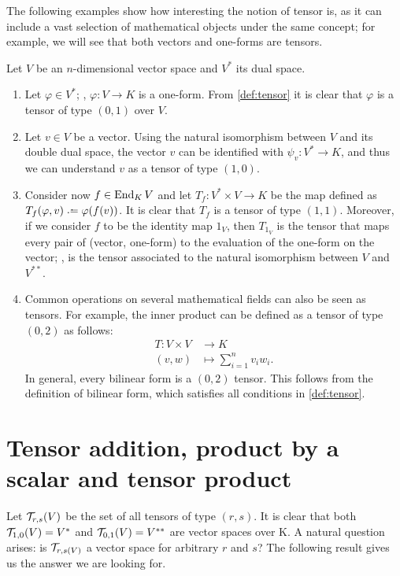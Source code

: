 \begin{example}
	\label{ex:tensors}
	The following examples show how interesting the notion of tensor is, as it can include a vast selection of mathematical objects under the same concept; for example, we will see that both vectors and one-forms are tensors.

	Let $V$ be an $n$-dimensional vector space and $V^*$ its dual space.
	\begin{enumerate}
		\item Let $\varphi \in V^*$; \ie,  $\varphi \colon V \to K$ is a one-form. From \autoref{def:tensor} it is clear that $\varphi$ is a tensor of type $(0,1)$ over $V$.
		\item Let $v \in V$ be a vector. Using the natural isomorphism between $V$ and its double dual space, the vector $v$ can be identified with $\psi_v \colon V^* \to K$, and thus we can understand $v$ as a tensor of type $(1,0)$.
		\item Consider now $f \in \operatorname{End}_K V$ and let $T_f \colon V^* \times V \to K$ be the map defined as $T_f(\varphi, v) \defeq \varphi(f(v))$. It is clear that $T_f$ is a tensor of type $(1,1)$. Moreover, if we consider $f$ to be the identity map $1_V$, then $T_{1_V}$ is the tensor that maps every pair of (vector, one-form) to the evaluation of the one-form on the vector; \ie, is the tensor associated to the natural isomorphism between $V$ and $V^{**}$.
		\item Common operations on several mathematical fields can also be seen as tensors. For example, the inner product can be defined as a tensor of type $(0,2)$ as follows:
		\begin{align*}
			T \colon V \times V &\to K\\
			(v,w) &\mapsto \sum_{i=1}^n v_i w_i.
		\end{align*}
		In general, every bilinear form is a $(0,2)$ tensor. This follows from the definition of bilinear form, which satisfies all conditions in \autoref{def:tensor}.
	\end{enumerate}
\end{example}

\section{Tensor addition, product by a scalar and tensor product}
Let ${\mathcal T}_{r,s}(V)$ be the set of all tensors of type $(r,s)$. It is clear that both ${\mathcal T}_{1,0}(V) = V^*$ and ${\mathcal T}_{0,1}(V) = V^{**}$ are vector spaces over K. A natural question arises: is ${\mathcal T}_{r,s(V)}$ a vector space for arbitrary $r$ and $s$? The following result gives us the answer we are looking for.

